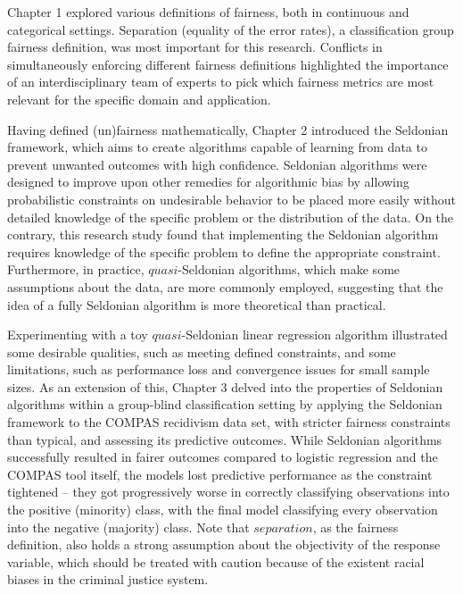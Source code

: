 \documentclass[12pt, twoside]{amherstthesis}
\begin{document}
Chapter 1 explored various definitions of fairness, both in continuous and categorical settings. Separation (equality of the error rates), a classification group fairness definition, was most important for this research. Conflicts in simultaneously enforcing different fairness definitions highlighted the importance of an interdisciplinary team of experts to pick which fairness metrics are most relevant for the specific domain and application.

Having defined (un)fairness mathematically, Chapter 2 introduced the Seldonian framework, which aims to create algorithms capable of learning from data to prevent unwanted outcomes with high confidence. Seldonian algorithms were designed to improve upon other remedies for algorithmic bias by allowing probabilistic constraints on undesirable behavior to be placed more easily without detailed knowledge of the specific problem or the distribution of the data. On the contrary, this research study found that implementing the Seldonian algorithm requires knowledge of the specific problem to define the appropriate constraint. Furthermore, in practice, \(\textit{quasi}\)-Seldonian algorithms, which make some assumptions about the data, are more commonly employed, suggesting that the idea of a fully Seldonian algorithm is more theoretical than practical.

Experimenting with a toy \(\textit{quasi}\)-Seldonian linear regression algorithm illustrated some desirable qualities, such as meeting defined constraints, and some limitations, such as performance loss and convergence issues for small sample sizes. As an extension of this, Chapter 3 delved into the properties of Seldonian algorithms within a group-blind classification setting by applying the Seldonian framework to the COMPAS recidivism data set, with stricter fairness constraints than typical, and assessing its predictive outcomes. While Seldonian algorithms successfully resulted in fairer outcomes compared to logistic regression and the COMPAS tool itself, the models lost predictive performance as the constraint tightened -- they got progressively worse in correctly classifying observations into the positive (minority) class, with the final model classifying every observation into the negative (majority) class. Note that \(\textit{separation}\), as the fairness definition, also holds a strong assumption about the objectivity of the response variable, which should be treated with caution because of the existent racial biases in the criminal justice system.
\end{document}
